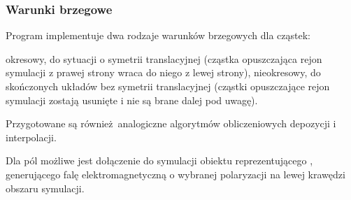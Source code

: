 





\subsubsection{Warunki brzegowe}
Program implementuje dwa rodzaje warunków brzegowych dla cząstek:
\begin{itemize}
\itemi{} okresowy, do sytuacji o symetrii translacyjnej (cząstka opuszczająca rejon symulacji z prawej strony wraca do niego z lewej strony),
\itemi{} nieokresowy, do skończonych układów bez symetrii translacyjnej (cząstki opuszczające rejon symulacji zostają usunięte i nie są brane
dalej pod uwagę).
\end{itemize}

Przygotowane są również analogiczne  %
algorytmów obliczeniowych depozycji i interpolacji.

Dla pól możliwe jest dołączenie do symulacji obiektu reprezentującego ,
generującego falę elektromagnetyczną o wybranej polaryzacji na lewej krawędzi obszaru symulacji.
